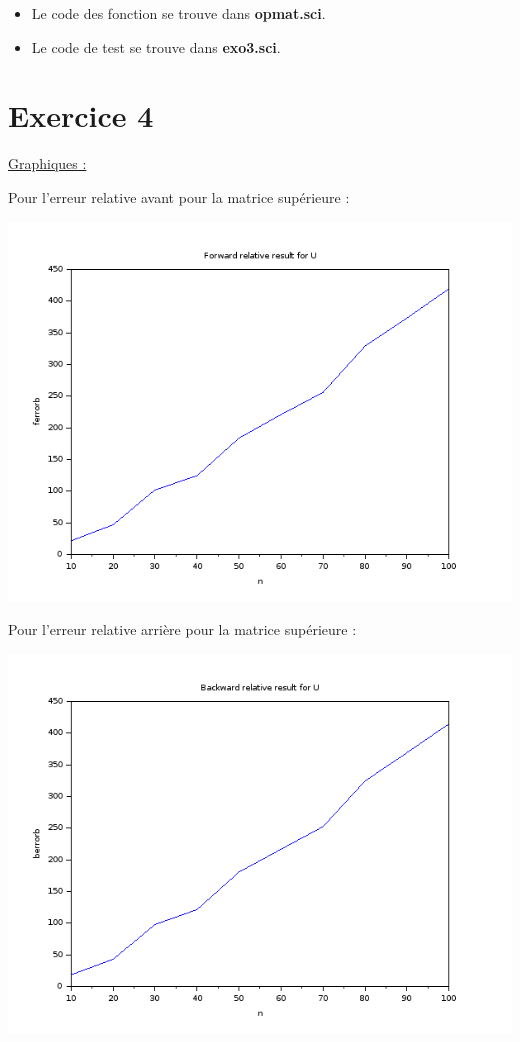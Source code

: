 \documentclass{article}
\begin{document}
\begin{itemize}
\item Le code des fonction se trouve dans \textbf{opmat.sci}.
\item Le code de test se trouve dans \textbf{exo3.sci}.
\end{itemize}

\section*{Exercice 4}

\underline{Graphiques :} \newline

Pour l'erreur relative avant pour la matrice supérieure :

\includegraphics[scale=0.5]{img/U_ferrorb.png}

Pour l'erreur relative arrière pour la matrice supérieure :

\includegraphics[scale=0.5]{img/U_berrorb.png}
\end{document}
